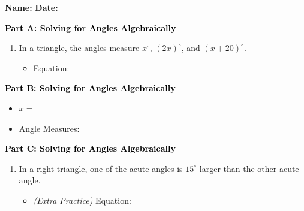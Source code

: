 \documentclass[12pt, letterpaper, fleqn]{article}
\newcommand{\blank}{\underline{\hspace{2.2cm}}}
\newcommand{\blanklong}{\underline{\hspace{6.5cm}}}
\begin{document}
\textbf{Name:} \underline{\hspace{5cm}}
\hfill
\textbf{Date:} \underline{\hspace{3cm}}\\

\begin{tcolorbox}[colback=customteal!20]
\large\textcolor{black}{\textbf{Part A: Solving for Angles Algebraically}}
\end{tcolorbox}

\vspace{3mm}

\begin{enumerate}[itemsep=5.5cm, leftmargin=0.6cm]
\item In a triangle, the angles measure $x^\circ$, $(2x)^\circ$, and $(x + 20)^\circ$.
\begin{itemize}
\item Equation: \blanklong
\end{itemize}
\end{enumerate}

\newpage

\begin{tcolorbox}[colback=customteal!20]
\large\textcolor{black}{\textbf{Part B: Solving for Angles Algebraically}}
\end{tcolorbox}

\vspace{3mm}

\begin{enumerate}[itemsep=5.5cm, leftmargin=0.6cm, resume]
\begin{itemize}
\item $x =$ \blank
\item Angle Measures: \blank
\end{itemize}
\end{enumerate}

\newpage

\begin{tcolorbox}[colback=customteal!20]
\large\textcolor{black}{\textbf{Part C: Solving for Angles Algebraically}}
\end{tcolorbox}

\vspace{3mm}

\begin{enumerate}[itemsep=5.5cm, leftmargin=0.6cm, resume]
\item In a right triangle, one of the acute angles is $15^\circ$ larger than the other acute angle. 
\begin{itemize}
\item \textit{(Extra Practice)} Equation: \blanklong
\end{itemize}
\end{enumerate}
\end{document}
